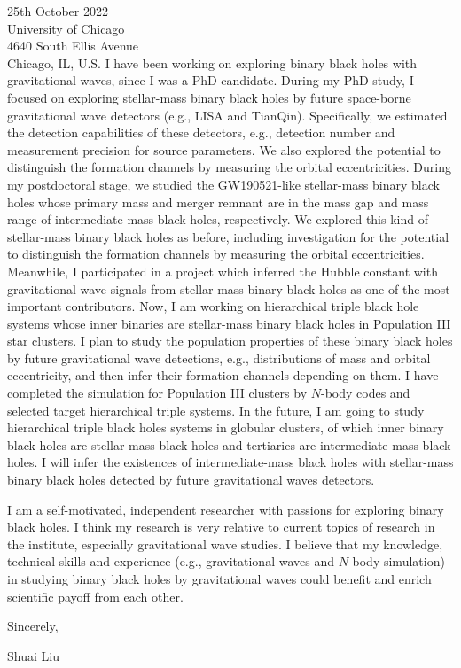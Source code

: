 \documentclass[11pt,a4paper,sans]{letter} %
\begin{document}
\begin{letter}{25th October 2022 \\
University of Chicago\\
4640 South Ellis Avenue\\ 
Chicago, IL, U.S.}
I have been working on exploring binary black holes with gravitational waves, since I was a PhD
    candidate. During my PhD study, I focused on exploring stellar-mass binary black holes by future
    space-borne gravitational wave detectors (e.g., LISA and TianQin). Specifically, we estimated the detection
    capabilities of
    these detectors, e.g., detection number and measurement precision for source parameters. We also explored the
    potential to distinguish the formation channels by measuring the orbital eccentricities. During my postdoctoral
    stage, we studied the GW190521-like stellar-mass binary black holes whose primary mass and merger remnant are in the
    mass gap and mass range of 
    intermediate-mass black holes, respectively. We explored this kind of stellar-mass binary black holes as before, including
    investigation for the potential to distinguish the formation channels by measuring the orbital eccentricities. 
    Meanwhile, I participated
    in a project which inferred the Hubble
    constant with gravitational wave signals from stellar-mass binary black holes as one of the most important
    contributors. 
    Now, I am working on
    hierarchical triple
    black hole systems whose inner binaries are stellar-mass binary black holes in Population III star clusters. I plan to
    study the population properties of these binary black holes by future gravitational wave detections, e.g., distributions of
    mass and orbital eccentricity, and then
    infer their formation channels depending on them. I have completed the simulation for Population III
    clusters by $N$-body codes and selected target hierarchical triple systems.  
    In the future, I am going to study hierarchical triple black holes systems in globular clusters, of which inner binary black holes are
    stellar-mass black holes and tertiaries are intermediate-mass black holes. I will infer the existences of
    intermediate-mass black holes with stellar-mass binary black holes detected by future gravitational waves detectors. 

I am a self-motivated, independent researcher with
    passions for exploring binary black holes. I think my research is very relative to current topics of research in the
    institute, especially gravitational wave studies. I believe that my knowledge,
    technical skills and experience (e.g., gravitational waves and $N$-body simulation) in studying binary black holes by
    gravitational waves could benefit and enrich scientific payoff
from each other. 

         
Sincerely,

Shuai Liu




\end{letter}
\end{document}
